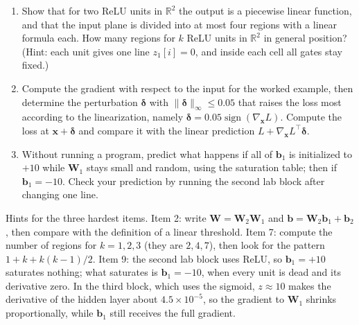 \begin{latihan}
\begin{enumerate}
  \item Show that for two ReLU units in $\mathbb{R}^{2}$ the output is a piecewise linear
        function, and that the input plane is divided into at most four regions with a linear
        formula each. How many regions for $k$ ReLU units in $\mathbb{R}^{2}$ in general
        position? (Hint: each unit gives one line $z_{1}[i]=0$, and inside each cell all gates
        stay fixed.)

  \item Compute the gradient with respect to the input for the worked example, then determine the
        perturbation $\boldsymbol{\delta}$ with $\lVert\boldsymbol{\delta}\rVert_{\infty}\le0.05$
        that raises the loss most according to the linearization, namely
        $\boldsymbol{\delta}=0.05\operatorname{sign}(\nabla_{\mathbf{x}}L)$. Compute the loss at
        $\mathbf{x}+\boldsymbol{\delta}$ and compare it with the linear prediction
        $L+\nabla_{\mathbf{x}}L^{\top}\boldsymbol{\delta}$.

  \item Without running a program, predict what happens if all of $\mathbf{b}_{1}$ is initialized
        to $+10$ while $\mathbf{W}_{1}$ stays small and random, using the saturation table; then
        if $\mathbf{b}_{1}=-10$. Check your prediction by running the second lab block after
        changing one line.
\end{enumerate}
\end{latihan}

Hints for the three hardest items. Item 2: write $\mathbf{W}=\mathbf{W}_{2}\mathbf{W}_{1}$ and
$\mathbf{b}=\mathbf{W}_{2}\mathbf{b}_{1}+\mathbf{b}_{2}$, then compare with the definition of a
linear threshold. Item 7: compute the number of regions for $k=1,2,3$ (they are $2,4,7$), then look for the
pattern $1+k+k(k-1)/2$. Item 9: the second lab block uses ReLU, so $\mathbf{b}_{1}=+10$ saturates nothing; what
saturates is $\mathbf{b}_{1}=-10$, when every unit is dead and its derivative zero. In the
third block, which uses the sigmoid, $z\approx10$ makes the derivative of the hidden layer
about $4.5\times10^{-5}$, so the gradient to $\mathbf{W}_{1}$ shrinks proportionally, while
$\mathbf{b}_{1}$ still receives the full gradient.

